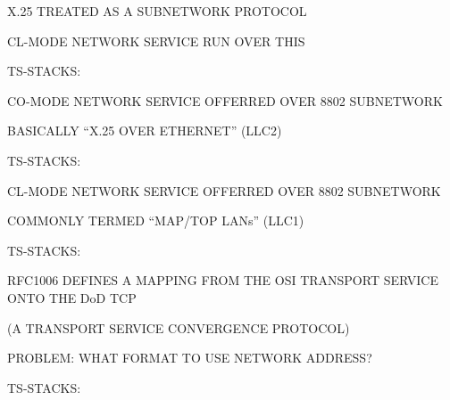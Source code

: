 \begin{bwslide}

\begin{nrtc}
\item	X.25 TREATED AS A SUBNETWORK PROTOCOL

\item	CL-MODE NETWORK SERVICE RUN OVER THIS

\item	TS-STACKS:
\end{nrtc}

\end{bwslide}


\begin{bwslide}

\begin{nrtc}
\item	CO-MODE NETWORK SERVICE OFFERRED OVER 8802 SUBNETWORK

\item	BASICALLY ``X.25 OVER ETHERNET'' (LLC2)

\item	TS-STACKS:
\end{nrtc}

\end{bwslide}


\begin{bwslide}

\begin{nrtc}
\item	CL-MODE NETWORK SERVICE OFFERRED OVER 8802 SUBNETWORK

\item	COMMONLY TERMED ``MAP/TOP LANs'' (LLC1)

\item	TS-STACKS:
\end{nrtc}

\end{bwslide}


\begin{bwslide}

\begin{nrtc}
\item	RFC1006 DEFINES A MAPPING FROM THE OSI TRANSPORT SERVICE ONTO THE DoD
	TCP
    \begin{nrtc}
    \item	(A TRANSPORT SERVICE CONVERGENCE PROTOCOL)
    \end{nrtc}

\item	PROBLEM: WHAT FORMAT TO USE NETWORK ADDRESS?

\item	TS-STACKS:
\end{nrtc}

\end{bwslide}


